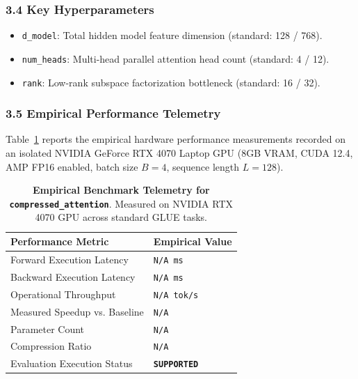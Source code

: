 \subsubsection*{3.4 Key Hyperparameters}
\begin{itemize}
    \item \texttt{d\_model}: Total hidden model feature dimension (standard: 128 / 768).
    \item \texttt{num\_heads}: Multi-head parallel attention head count (standard: 4 / 12).
    \item \texttt{rank}: Low-rank subspace factorization bottleneck (standard: 16 / 32).
\end{itemize}

\subsubsection*{3.5 Empirical Performance Telemetry}
Table~\ref{tab:telemetry_compressed_attention} reports the empirical hardware performance measurements recorded on an isolated NVIDIA GeForce RTX 4070 Laptop GPU (8GB VRAM, CUDA 12.4, AMP FP16 enabled, batch size $B=4$, sequence length $L=128$).

\begin{table}[h]
\centering
\small
\caption{\textbf{Empirical Benchmark Telemetry for \texttt{compressed\_attention}}. Measured on NVIDIA RTX 4070 GPU across standard GLUE tasks.}
\label{tab:telemetry_compressed_attention}
\begin{tabularx}{\columnwidth}{lX}
\toprule
\textbf{Performance Metric} & \textbf{Empirical Value} \\
\midrule
Forward Execution Latency & \texttt{N/A ms} \\
Backward Execution Latency & \texttt{N/A ms} \\
Operational Throughput & \texttt{N/A tok/s} \\
Measured Speedup vs. Baseline & \texttt{N/A} \\
Parameter Count & \texttt{N/A} \\
Compression Ratio & \texttt{N/A} \\
Evaluation Execution Status & \textbf{\texttt{SUPPORTED}} \\
\bottomrule
\end{tabularx}
\end{table}

